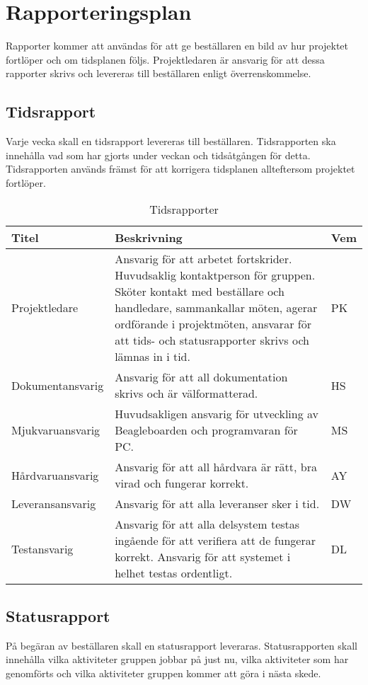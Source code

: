 \section{Rapporteringsplan}
Rapporter kommer att användas för att ge beställaren en bild av hur projektet fortlöper och om tidsplanen följs. Projektledaren är ansvarig för att dessa rapporter skrivs och levereras till beställaren enligt överrenskommelse.

\subsection{Tidsrapport}
Varje vecka skall en tidsrapport levereras till beställaren. Tidsrapporten ska innehålla vad som har gjorts under veckan och tidsåtgången för detta. Tidsrapporten används främst för att korrigera tidsplanen allteftersom projektet fortlöper.

\begin{table}[h]
	\centering
		\begin{tabularx}{\textwidth}{| l | X | l |}
			\hline
			\textbf{Titel} & \textbf{Beskrivning} & \textbf{Vem} \\
			\hline
			{Projektledare} & {Ansvarig för att arbetet fortskrider. Huvudsaklig kontaktperson för gruppen. Sköter kontakt med beställare och handledare, sammankallar möten, agerar ordförande i projektmöten, ansvarar för att tids- och statusrapporter skrivs och lämnas in i tid.} & {PK} \\\hline
			{Dokumentansvarig} & {Ansvarig för att all dokumentation skrivs och är välformatterad.} & {HS} \\\hline
			{Mjukvaruansvarig} & {Huvudsakligen ansvarig för utveckling av Beagleboarden och programvaran för PC.} & {MS} \\\hline
			{Hårdvaruansvarig} & {Ansvarig för att all hårdvara är rätt, bra virad och fungerar korrekt.} & {AY} \\\hline
			{Leveransansvarig} & {Ansvarig för att alla leveranser sker i tid.} & {DW} \\\hline
			{Testansvarig} & {Ansvarig för att alla delsystem testas ingående för att verifiera att de fungerar korrekt. Ansvarig för att systemet i helhet testas ordentligt.} & {DL} \\\hline
		\end{tabularx}
	\caption{Tidsrapporter} \label{projektrapport:tabell}
\end{table}

\subsection{Statusrapport}
På begäran av beställaren skall en statusrapport leveraras. Statusrapporten skall innehålla vilka aktiviteter gruppen jobbar på just nu, vilka aktiviteter som har genomförts och vilka aktiviteter gruppen kommer att göra i nästa skede.
